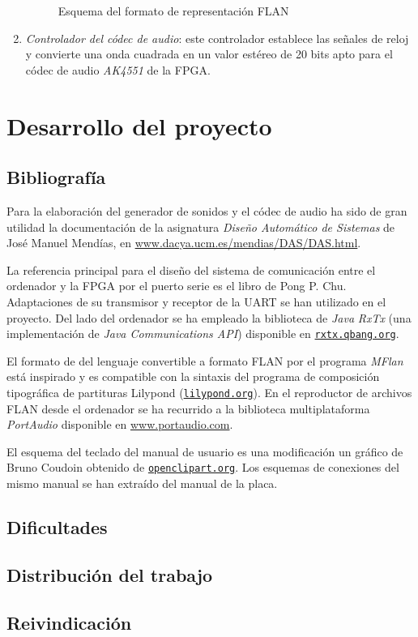\documentclass{article}
\begin{document}
\begin{enumerate}
\begin{figure}[ht]
		\caption{Esquema del formato de representación FLAN}
	\end{figure}

	\item {\itshape Controlador del códec de audio}: este controlador establece las señales de reloj y convierte una onda cuadrada en un valor estéreo de 20 bits apto para el códec de audio {\itshape AK4551} de la FPGA.
\end{enumerate}

\section{Desarrollo del proyecto}

\subsection{Bibliografía}
	Para la elaboración del generador de sonidos y el códec de audio ha sido de gran utilidad la documentación de la asignatura {\itshape Diseño Automático de Sistemas} de José Manuel Mendías, en \url{www.dacya.ucm.es/mendias/DAS/DAS.html}.

	\medskip La referencia principal para el diseño del sistema de comunicación entre el ordenador y la FPGA por el puerto serie es el libro \cite{PCHU} de Pong P. Chu. Adaptaciones de su transmisor y receptor de la UART se han utilizado en el proyecto. Del lado del ordenador se ha empleado la biblioteca de {\itshape Java} {\itshape RxTx} (una implementación de {\itshape Java Communications API}) disponible en \href{http://rxtx.qbang.org}{\nolinkurl{rxtx.qbang.org}}.

	\medskip El formato de del lenguaje convertible a formato FLAN por el programa {\itshape MFlan} está inspirado y es compatible con la sintaxis del programa de composición tipográfica de partituras Lilypond (\href{http://lilypond.org}{\nolinkurl{lilypond.org}}). En el reproductor de archivos FLAN desde el ordenador se ha recurrido a la biblioteca multiplataforma {\itshape PortAudio} disponible en \url{www.portaudio.com}.

	\medskip El esquema del teclado del manual de usuario es una modificación un gráfico de Bruno Coudoin obtenido de \href{http://openclipart.org}{\nolinkurl{openclipart.org}}. Los esquemas de conexiones del mismo manual se han extraído del manual de la placa.

\subsection{Dificultades}

\subsection{Distribución del trabajo}

\subsection{Reivindicación}

\newpage
{} {}


\end{document}
